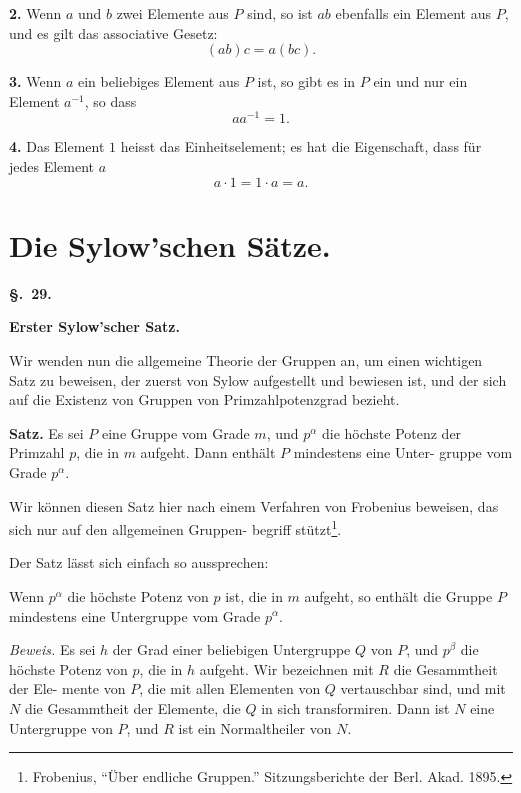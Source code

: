 \documentclass[12pt,a4paper]{article}
\begin{document}
\medskip
\noindent\textbf{2.} Wenn $a$ und $b$ zwei Elemente aus $P$ sind, so ist
$ab$ ebenfalls ein Element aus $P$, und es gilt das
associative Gesetz:
\[(ab)c = a(bc).\]

\medskip
\noindent\textbf{3.} Wenn $a$ ein beliebiges Element aus $P$ ist, so gibt
es in $P$ ein und nur ein Element $a^{-1}$, so dass
\[aa^{-1} = 1.\]

\medskip
\noindent\textbf{4.} Das Element $1$ heisst das Einheitselement; es hat
die Eigenschaft, dass f\"ur jedes Element $a$
\[a \cdot 1 = 1 \cdot a = a.\]

\newpage
\section{Die Sylow'schen S\"atze.}
\label{sec:29}

\begin{center}\textbf{\S.~29.}\end{center}
\begin{center}\large\bfseries Erster Sylow'scher Satz.\end{center}

Wir wenden nun die allgemeine Theorie der Gruppen an,
um einen wichtigen Satz zu beweisen, der zuerst von Sylow
aufgestellt und bewiesen ist, und der sich auf die Existenz von
Gruppen von Primzahlpotenzgrad bezieht.

\medskip
\noindent\textbf{Satz.} Es sei $P$ eine Gruppe vom Grade $m$, und
$p^\alpha$ die h\"ochste Potenz der Primzahl $p$, die in $m$
aufgeht. Dann enth\"alt $P$ mindestens eine Unter-
gruppe vom Grade $p^\alpha$.

Wir k\"onnen diesen Satz hier nach einem Verfahren von
Frobenius beweisen, das sich nur auf den allgemeinen Gruppen-
begriff st\"utzt\footnote{Frobenius, ``\"Uber endliche Gruppen.'' Sitzungsberichte der Berl.
Akad. 1895.}.

Der Satz l\"asst sich einfach so aussprechen:

Wenn $p^\alpha$ die h\"ochste Potenz von $p$ ist, die in $m$ aufgeht,
so enth\"alt die Gruppe $P$ mindestens eine Untergruppe vom
Grade $p^\alpha$.

\medskip
\noindent\textit{Beweis.} Es sei $h$ der Grad einer beliebigen Untergruppe
$Q$ von $P$, und $p^\beta$ die h\"ochste Potenz von $p$, die in $h$
aufgeht. Wir bezeichnen mit $R$ die Gesammtheit der Ele-
mente von $P$, die mit allen Elementen von $Q$ vertauschbar
sind, und mit $N$ die Gesammtheit der Elemente, die $Q$ in
sich transformiren. Dann ist $N$ eine Untergruppe von $P$,
und $R$ ist ein Normaltheiler von $N$.
\end{document}
